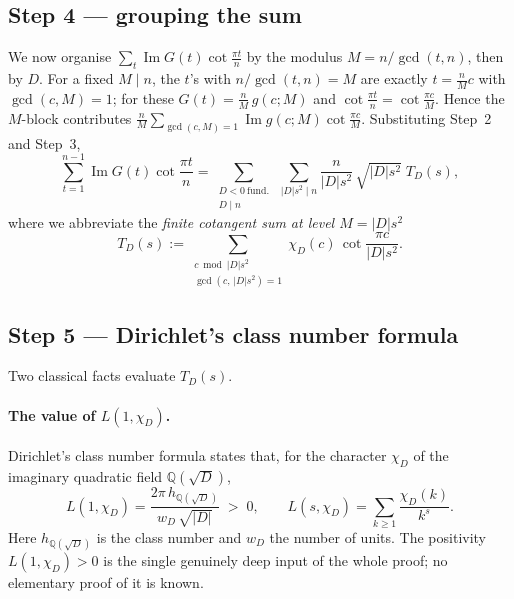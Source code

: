 \documentclass[11pt]{article}
\DeclareMathOperator{\Imag}{Im}
\begin{document}
\subsection{Step 4 --- grouping the sum}
We now organise $\sum_{t}\Imag G(t)\cot\frac{\pi t}{n}$ by the modulus $M=n/\gcd(t,n)$, then by $D$. For a fixed
$M\mid n$, the $t$'s with $n/\gcd(t,n)=M$ are exactly $t=\tfrac nM c$ with $\gcd(c,M)=1$; for these
$G(t)=\tfrac nM\,g(c;M)$ and $\cot\frac{\pi t}{n}=\cot\frac{\pi c}{M}$. Hence the $M$-block contributes
$\frac nM\sum_{\gcd(c,M)=1}\Imag g(c;M)\cot\frac{\pi c}{M}$. Substituting Step~2 and Step~3,
\[
\sum_{t=1}^{n-1}\Imag G(t)\cot\frac{\pi t}{n}
=\sum_{\substack{D<0\ \text{fund.}\\ D\mid n}}\ \sum_{|D|s^2\mid n}
\frac{n}{|D|s^2}\,\sqrt{|D|s^2}\;T_D(s),
\]
where we abbreviate the \emph{finite cotangent sum at level $M=|D|s^2$}
\[
T_D(s):=\sum_{\substack{c\bmod |D|s^2\\ \gcd(c,\,|D|s^2)=1}}\chi_D(c)\,\cot\frac{\pi c}{|D|s^2}.
\]

\subsection{Step 5 --- Dirichlet's class number formula}
Two classical facts evaluate $T_D(s)$.

\paragraph{The value of $L(1,\chi_D)$.}
Dirichlet's class number formula states that, for the character $\chi_D$ of the imaginary quadratic field
$\mathbb{Q}(\sqrt D)$,
\[
L(1,\chi_D)=\frac{2\pi\,h_{\mathbb{Q}(\sqrt D)}}{w_D\,\sqrt{|D|}}\;>\;0,
\qquad L(s,\chi_D)=\sum_{k\ge1}\frac{\chi_D(k)}{k^s}.
\]
Here $h_{\mathbb{Q}(\sqrt D)}$ is the class number and $w_D$ the number of units. The positivity
$L(1,\chi_D)>0$ is the single genuinely deep input of the whole proof; no elementary proof of it is known.
\end{document}
